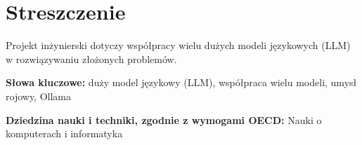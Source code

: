 \chapter*{Streszczenie}

Projekt inżynierski dotyczy współpracy wielu dużych modeli językowych (LLM) w rozwiązywaniu złożonych problemów.

\vspace{\baselineskip}

\noindent
\textbf{Słowa kluczowe:} duży model językowy (LLM), współpraca wielu modeli, umysł rojowy, Ollama

\noindent
\textbf{Dziedzina nauki i techniki, zgodnie z wymogami OECD:} Nauki o komputerach i informatyka